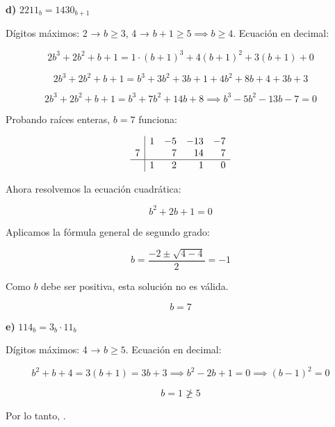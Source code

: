\documentclass[a4paper,12pt]{article}
\begin{document}
\begin{ejercicio}[title=Ejercicio 3]

\textbf{d) } $2211_b = 1430_{b+1}$  

\vspace{0.5em}

Dígitos máximos: 2 → $b \ge 3$, 4 → $b+1 \ge 5 \implies b \ge 4$.  
Ecuación en decimal:

\[
2b^3 + 2b^2 + b + 1 = 1\cdot(b+1)^3 + 4(b+1)^2 + 3(b+1) + 0
\]

\[
2b^3 + 2b^2 + b + 1 = b^3 + 3b^2 + 3b + 1 + 4b^2 + 8b + 4 + 3b + 3
\]

\[
2b^3 + 2b^2 + b + 1 = b^3 + 7b^2 + 14b + 8 \implies b^3 - 5b^2 - 13b - 7 = 0
\]

Probando raíces enteras, $b=7$ funciona:

\[
\begin{array}{r|rrrr}
  & 1 & -5 & -13 & -7 \\
7 &   & 7 & 14 & 7 \\
\hline
  & 1 & 2 & 1 & 0 \\
\end{array}
\]

Ahora resolvemos la ecuación cuadrática:

\[
b^2 + 2b + 1 = 0
\]

Aplicamos la fórmula general de segundo grado:

\[
b = \frac{-2 \pm \sqrt{4 - 4}}{2} = -1
\]

Como $b$ debe ser positiva, esta solución no es válida.  

\[
\boxed{b = 7}
\]

\vspace{0.5em}

\textbf{e) } $114_b = 3_b \cdot 11_b$  

\vspace{0.5em}

Dígitos máximos: 4 → $b \ge 5$.  
Ecuación en decimal:

\[
b^2 + b + 4 = 3(b+1) = 3b + 3 \implies b^2 - 2b + 1 = 0 \implies (b-1)^2 = 0
\]

\[
b = 1 \not\ge 5
\]

Por lo tanto, .
\end{ejercicio}
\end{document}
